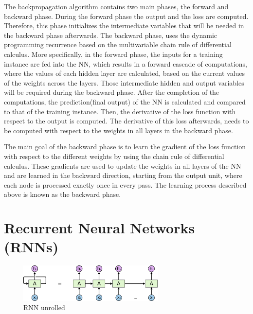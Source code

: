     The backpropagation algorithm contains two main phases, the forward and backward phase. During the forward phase the output and the loss are computed. Therefore, this phase initializes the intermediate variables that will be needed in the backward phase afterwards. The backward phase, uses the dynamic programming recurrence based on the multivariable chain rule of differential calculus. 
    More specifically, in the forward phase, the inputs for a training instance are fed into the NN, which results in a forward cascade of computations, where the values of each hidden layer are calculated, based on the current values of the weights across the layers. Those intermediate hidden and output variables will be required during the backward phase. After the completion of the computations, the prediction(final output) of the NN is calculated and compared to that of the training instance. Then, the derivative of the loss function with respect to the output is computed. The derivative of this loss afterwards, needs to be computed with respect to the weights in all layers in the backward phase.
    
    The main goal of the backward phase is to learn the gradient of the loss function with respect to the different weights by using the chain rule of differential calculus. These gradients are used to update the weights in all layers of the NN and are learned in the backward direction, starting from the output unit, where each node is processed exactly once in every pass. The learning process described above is known as the backward phase.
    
    \section{Recurrent Neural Networks (RNNs)} 
    
    \begin{figure}[h]
        \centering
        \includegraphics[width=0.65\textwidth]{media/RNN-unrolled.png}
        \caption{RNN unrolled}
        \label{fig:lstm}
    \end{figure}

